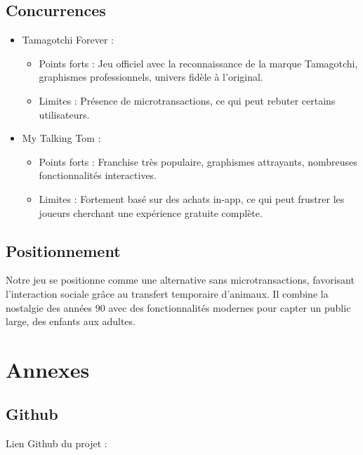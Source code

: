 \documentclass{cahier_des_charges}
\begin{document}
\subsection{Concurrences}
\begin{itemize}[label=\textbullet]
\item Tamagotchi Forever :
\begin{itemize}[label=\textendash]
\item Points forts : Jeu officiel avec la reconnaissance de la marque Tamagotchi,
graphismes professionnels, univers fidèle à l’original.
\item Limites : Présence de microtransactions, ce qui peut rebuter certains utilisateurs.
\end{itemize}
\item My Talking Tom :
\begin{itemize}[label=\textendash]
\item Points forts : Franchise très populaire, graphismes attrayants, nombreuses
fonctionnalités interactives.
\item Limites : Fortement basé sur des achats in-app, ce qui peut frustrer les joueurs
cherchant une expérience gratuite complète.
\end{itemize}
\end{itemize}
\subsection{Positionnement}
Notre jeu se positionne comme une alternative sans microtransactions, favorisant l’interaction
sociale grâce au transfert temporaire d’animaux. Il combine la nostalgie des années 90 avec des
fonctionnalités modernes pour capter un public large, des enfants aux adultes.
\section{Annexes}
\subsection{Github}
Lien Github du projet : 
\end{document}
